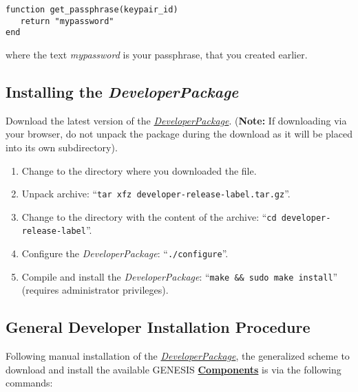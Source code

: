 \documentclass[12pt]{article}
\begin{document}
\begin{verbatim}
function get_passphrase(keypair_id)	
   return "mypassword"
end
\end{verbatim}

where the text {\it mypassword} is your passphrase, that you created earlier. 


\subsection*{Installing the {\it DeveloperPackage}}

Download the latest version of the \href{https://github.com/HugoCornelis/developer/blob/master/developer-0.0.0-alpha.tar.gz?raw=true}{{\it DeveloperPackage}}.  ({\bf Note:} If downloading via your browser, do not unpack the package during the download as it will be placed into its own subdirectory).
\begin{enumerate}
   \item Change to the directory where you downloaded the file.
   \item Unpack archive: ``{\tt tar xfz developer-release-label.tar.gz}''.
   \item Change to the directory with the content of the archive: ``{\tt cd developer-release-label}''.
   \item Configure the {\it DeveloperPackage}: ``{\tt ./configure}''.
   \item Compile and install the {\it DeveloperPackage}: ``{\tt make \&\& sudo make install}'' (requires administrator privileges).
\end{enumerate}

\subsection*{General Developer Installation Procedure}

Following manual installation of the \href{../developer-package/developer-package.tex}{\it DeveloperPackage}, the generalized scheme to download and install the available GENESIS \href{../reserved-words/reserved-words.tex}{\bf Components} is via the following commands:
\end{document}
